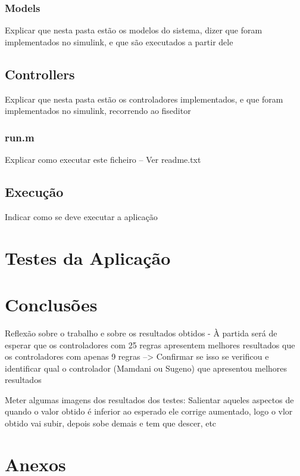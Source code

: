 \documentclass{article}
\begin{document}
\subsubsection{Models}

Explicar que nesta pasta estão os modelos do sistema, dizer que foram implementados no simulink, e que são executados a partir dele

\subsection{Controllers}

Explicar que nesta pasta estão os controladores implementados, e que foram implementados no simulink, recorrendo ao fiseditor

\subsubsection{run.m}

Explicar como executar este ficheiro -- Ver readme.txt


\subsection{Execução}

Indicar como se deve executar a aplicação


\pagebreak

\section{Testes da Aplicação}




\pagebreak

\section{Conclusões}

Reflexão sobre o trabalho e sobre os resultados obtidos - À partida será de esperar que os controladores com 25 regras apresentem melhores resultados que os controladores com apenas 9 regras --> Confirmar se isso se verificou e identificar qual o controlador (Mamdani ou Sugeno) que apresentou melhores resultados

Meter algumas imagens dos resultados dos testes: Salientar aqueles aspectos de quando o valor obtido é inferior ao esperado ele corrige aumentado, logo o vlor obtido vai subir, depois sobe demais e tem que descer, etc

\pagebreak

\section{Anexos}
\end{document}
